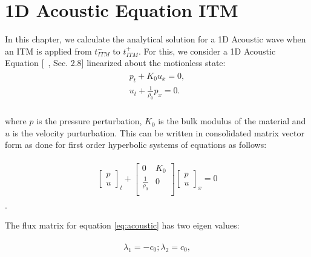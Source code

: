 
\chapter{1D Acoustic Equation \ac{ITM}}\label{chapter:ITMAcoustic}
In this chapter, we calculate the analytical solution for a 1D Acoustic wave when an \ac{ITM} is applied from $t_{ITM}^-$ to $t_{ITM}^+$.
For this, we consider a 1D Acoustic Equation [~\parencite{leveque_2002}, Sec. 2.8] linearized about the motionless state:
\begin{align}
    \begin{split}
        p_t + K_0u_x = 0, \\
        u_t + \frac{1}{\rho_0}p_x = 0 .\\
    \end{split}
\end{align}

where $p$ is the pressure perturbation, $K_0$ is the bulk modulus of the material and $u$ is the velocity purturbation. 
This can be written in consolidated matrix vector form as done for first order hyperbolic systems of equations as follows:

\begin{align}
    \begin{split}
    \begin{bmatrix}
        p \\
        u
    \end{bmatrix}_t + 
    \begin{bmatrix}
        0 & K_0 \\
        \frac{1}{\rho_0} & 0 \\
    \end{bmatrix}
    \begin{bmatrix}
        p \\
        u
    \end{bmatrix}_x = 0
    \end{split}
    \label{eq:acoustic}
\end{align}.

The flux matrix for equation \ref{eq:acoustic} has two eigen values:

\begin{align}
    \begin{split}
        \lambda_1 = -c_0; \lambda_2 = c_0,
    \end{split}
\end{align}

